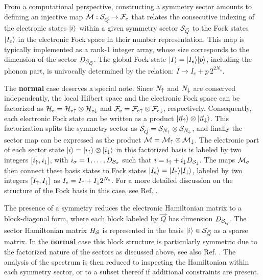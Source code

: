 \documentclass[edipack_sp.tex]{subfiles}
\begin{document}
From a computational perspective, constructing a symmetry
sector amounts to defining an injective map
${\cal M}:{\cal S}_{\vec{Q}}\rightarrow {\cal F}_e$ that relates the consecutive indexing of the electronic states  $|i\rangle$
within a given symmetry sector ${\cal S}_{\vec{Q}}$ to the Fock states $|I_e\rangle$ in the electronic Fock space in their number representation. 
This map is typically implemented as a rank-1 integer array, whose size corresponds to the dimension of the sector $D_{{\cal S}_{\vec{Q}}}$. 
The global Fock state $|I\rangle=|I_e\rangle|p\rangle$, including the phonon part, is univocally determined by the relation: $I\to I_e + p\,2^{2 N_s}$.


The {\bf normal} case deserves a special note. Since $N_\uparrow$ and
$N_\downarrow$ are conserved independently, the local Hilbert
space and the electronic Fock space can be factorized as
${\cal H}_e={\cal H}_{e\uparrow}\otimes{\cal H}_{e\downarrow}$ and ${\cal F}_\mathrm{e} = {\cal F}_{e\uparrow}\otimes {\cal F}_{e\downarrow}$, respectively.  
Consequently, each electronic Fock state can be written as a product $|\vec{n}_\uparrow\rangle\otimes |\vec{n}_\downarrow\rangle$. This factorization splits the
symmetry sector as ${\cal S}_{\vec{Q}} = {\cal S}_{N_\uparrow}\otimes{\cal S}_{N_\downarrow}$,
and finally the sector map can be expressed as the product ${\cal M} = {\cal M}_\uparrow
\otimes {\cal M}_\downarrow$.
%
The electronic part of each sector state $|i\rangle=|i_\uparrow\rangle \otimes |i_\downarrow\rangle$ in this factorized basis
is labeled by two integers $[i_\uparrow,i_\downarrow]$, with 
$i_\sigma=1,\dots,D_{{\cal S}_\sigma}$ such that $i=i_\uparrow + i_\downarrow
D_{{\cal S}_\downarrow}$.
The maps ${\cal M}_\sigma$ then connect these basis states to Fock states
$|I_e\rangle=|I_\uparrow\rangle|I_\downarrow\rangle$, labeled by two integers
$[I_\uparrow,I_\downarrow]$ as $I_e=I_\uparrow +   I_\downarrow 2^{N_\mathrm{s}}$.
For a more detailed discussion on the structure of the Fock basis in this case, see Ref. \cite{Amaricci2022CPC}. 

The presence of a symmetry reduces the electronic Hamiltonian matrix to
a block-diagonal form, where each block labeled by $\vec{Q}$ has dimension
$D_{{\cal S}_{\vec{Q}}}$. The sector Hamiltonian matrix $H_{\cal S}$ is represented in the
basis $|i\rangle\in{\cal S}_{\vec{Q}}$ as a sparse matrix.
In the {\bf normal} case this block structure is particularly
symmetric due to the factorized nature of the sectors as discussed
above, see also Ref. \cite{Amaricci2022CPC}.
The analysis of the spectrum is then reduced to inspecting the
Hamiltonian within each symmetry sector, or to a subset thereof if
additional constraints are present.



\end{document}
